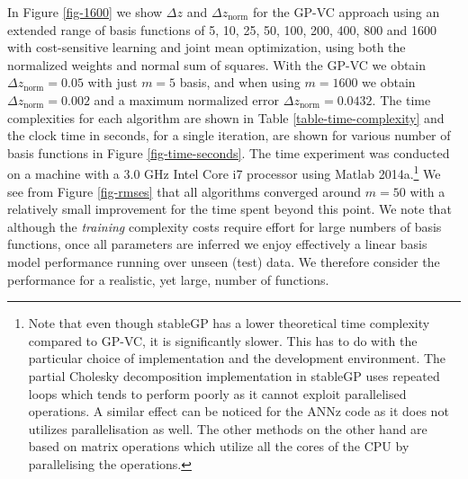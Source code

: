 \documentclass[useAMS,usenatbib,fleqn]{mn2e}
\begin{document}
In Figure \ref{fig-1600} we show $\Delta z$ and $\Delta z_\textrm{norm}$ for the GP-VC approach using an extended range of basis functions of 5, 10, 25, 50, 100, 200, 400, 800 and 1600 with cost-sensitive learning and joint mean optimization, using both the normalized weights and normal sum of squares. With the GP-VC we obtain $\Delta z_\textrm{norm} = 0.05$ with just $m=5$ basis, and when using $m=1600$ we obtain $\Delta z_\textrm{norm} = 0.002$ and  a maximum normalized error $\Delta z_\textrm{norm} = 0.0432$. The  time complexities for each algorithm are shown in Table \ref{table-time-complexity} and the clock time in seconds, for a single iteration, are shown for various number of basis functions in Figure \ref{fig-time-seconds}. The time experiment was conducted on a machine with a 3.0 GHz Intel Core i7 processor using Matlab 2014a.\footnote{Note that even though stableGP has a lower theoretical time complexity compared to GP-VC, it is significantly slower. This has to do with the particular choice of implementation and the development environment. The partial Cholesky decomposition implementation in stableGP \citep{stableGP} uses repeated loops which tends to perform poorly as it cannot exploit parallelised operations. A similar effect can be noticed for the ANNz code as it does not utilizes parallelisation as well. The other methods on the other hand are based on matrix operations which utilize all the cores of the CPU by parallelising the operations.} We see from Figure \ref{fig-rmses} that all algorithms converged around $m=50$ with a relatively small improvement for the time spent beyond this point. We note that although the \emph{training} complexity costs require effort for large numbers of basis functions, once all parameters are inferred we enjoy effectively a linear basis model performance running over unseen (test) data. We therefore consider the performance for a realistic, yet large, number of functions. 


\end{document}

